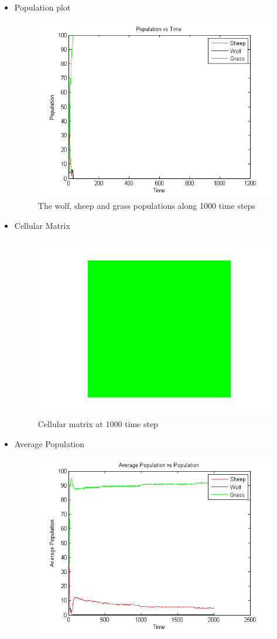 \documentclass[prl,12pt,citeautoscript,reprint]{revtex4-1}
\begin{document}
\begin{itemize}
\item Population plot
\begin{figure}[H]
\centering
\includegraphics[width = 0.8\columnwidth]{2a} 

\caption{The wolf, sheep and grass populations along 1000 time steps}\label{Fig:Population vs time}
\end{figure}
\item Cellular Matrix 
\begin{figure}[H]
\centering
\includegraphics[width =0.8\columnwidth]{2b} 
 
\caption{Cellular matrix at 1000 time step}\label{Fig:Cellular matrix at 1000 time step}
\end{figure}

\item Average Population 
\begin{figure}[H]
\centering
\includegraphics[width = 0.8\columnwidth]{2c} 
 

\end{figure}
\end{itemize}
\end{document}
